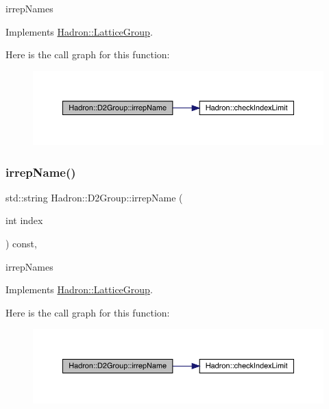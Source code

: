 irrep\+Names 

Implements \mbox{\hyperlink{structHadron_1_1LatticeGroup_a4bc5620218c2a73157e19bc4451fe746}{Hadron\+::\+Lattice\+Group}}.

Here is the call graph for this function\+:
\nopagebreak
\begin{figure}[H]
\begin{center}
\leavevmode
\includegraphics[width=350pt]{d8/de7/structHadron_1_1D2Group_a502111e32a238c50b248b9f7b0625385_cgraph}
\end{center}
\end{figure}
\mbox{\label{structHadron_1_1D2Group_a502111e32a238c50b248b9f7b0625385}} 
\subsubsection{\texorpdfstring{irrepName()}{irrepName()}\hspace{0.1cm}{\footnotesize\ttfamily [3/3]}}
{\footnotesize\ttfamily std\+::string Hadron\+::\+D2\+Group\+::irrep\+Name (\begin{DoxyParamCaption}\item[{int}]{index }\end{DoxyParamCaption}) const\hspace{0.3cm}{\ttfamily [inline]}, {\ttfamily [virtual]}}

irrep\+Names 

Implements \mbox{\hyperlink{structHadron_1_1LatticeGroup_a4bc5620218c2a73157e19bc4451fe746}{Hadron\+::\+Lattice\+Group}}.

Here is the call graph for this function\+:
\nopagebreak
\begin{figure}[H]
\begin{center}
\leavevmode
\includegraphics[width=350pt]{d8/de7/structHadron_1_1D2Group_a502111e32a238c50b248b9f7b0625385_cgraph}
\end{center}
\end{figure}
\mbox{\label{structHadron_1_1D2Group_a65d28ef1fef635e870d60b6606b65f19}} 
